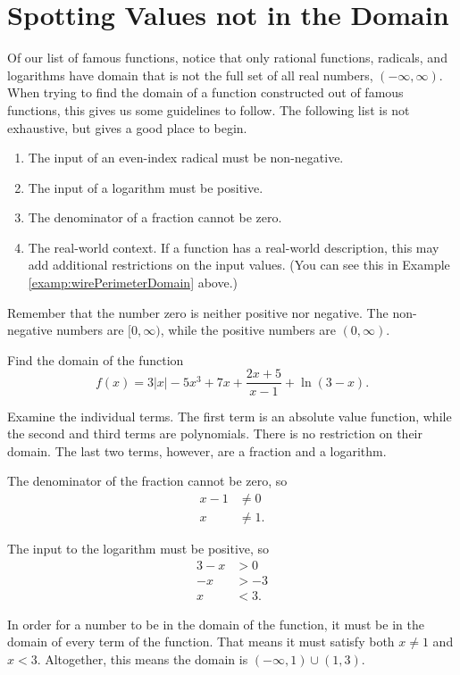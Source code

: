 \documentclass[nooutcomes]{ximera}
\begin{document}
\section{Spotting Values not in the Domain}
	Of our list of famous functions, notice that only rational functions, radicals, and logarithms have domain that is not the full set of all real numbers, $(-\infty, \infty)$. When trying to find the domain of a function 
	constructed out of famous functions, this gives us some guidelines to follow. The following list is not exhaustive, but gives a good place to begin.
	\begin{callout}
		\begin{enumerate}
			\item The input of an even-index radical must be non-negative.
			\item The input of a logarithm must be positive.
			\item The denominator of a fraction cannot be zero.
			\item The real-world context. If a function has a real-world description, this may add additional restrictions on the input values. (You can see this in Example \ref{examp:wirePerimeterDomain} above.)
		\end{enumerate}
	\end{callout}
	Remember that the number zero is neither positive nor negative. The non-negative numbers are $[0, \infty)$, while the positive numbers are $(0, \infty)$.
	
	\begin{example}
		Find the domain of the function $$f(x) = 3|x| - 5x^3+7x + \dfrac{2x+5}{x-1} + \ln(3-x).$$

		\begin{explanation}
			Examine the individual terms. The first term is an absolute value function, while the second and third terms are polynomials. There is no restriction on their domain. The last two terms, however, are a fraction and a logarithm.
			
			The denominator of the fraction cannot be zero, so 
			\begin{align*}
				x-1 &\neq 0\\
				x &\neq 1.
			\end{align*}
			
			The input to the logarithm must be positive, so 
			\begin{align*}
				3-x &> 0\\
				-x & > -3\\
				x &< 3. 			
			\end{align*}

			In order for a number to be in the domain of the function, it must be in the domain of every term of the function. That means it must satisfy both $x \neq 1$ and $x < 3$.
			Altogether, this means the domain is $(-\infty, 1) \cup (1, 3)$.
		\end{explanation}
	\end{example}
\end{document}
